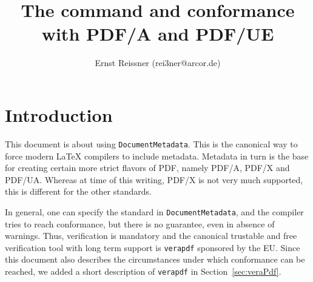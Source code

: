 \documentclass[10pt, a4paper]{article}
\title{The command \cmd{DocumentMetadata} and conformance with PDF/A and PDF/UE}
\author{Ernst Reissner (rei3ner@arcor.de)}
\date{\Today}
\makeatletter
\newcommand{\bs}{\symbol{'134}} %
\newcommand{\cmd}[2][]{\texttt{\bs{}#2#1}}
\newcommand{\cmd}[2][]{\texttt{\bs{}#2#1}\sindex[cmd]{#2@\texttt{\bs{}#2}}}
\makeatother
\begin{document}
\maketitle

\tableofcontents
\listoftables

\section{Introduction}\label{sec:intro}

This document is about using \cmd{DocumentMetadata}. 
This is the canonical way to force modern \LaTeX{} compilers to include metadata. 
Metadata in turn is the base for creating certain more strict flavors of PDF, 
namely PDF/A, PDF/X and PDF/UA\@. 
Whereas at time of this writing, PDF/X is not very much supported, 
this is different for the other standards. 

In general, one can specify the standard in \cmd{DocumentMetadata}, 
and the compiler tries to reach conformance, but there is no guarantee, 
even in absence of warnings. 
Thus, verification is mandatory and the canonical trustable and free verification tool 
with long term support is \texttt{verapdf} sponsored by the EU\@. 
Since this document also describes the circumstances under which conformance can be reached, 
we added a short description of \texttt{verapdf} in Section~\ref{sec:veraPdf}. 


%
\end{document}
